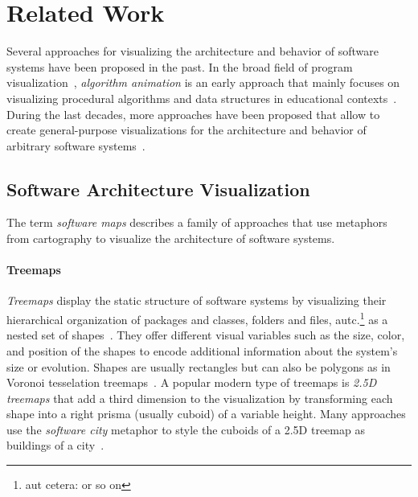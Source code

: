 \section{Related Work}
\label{sec:related_work}

Several approaches for visualizing the architecture and behavior of software systems have been proposed in the past.
In the broad field of program visualization~\cite{myers1986visual,sorva2013review,teyseyre2009overview}, \emph{algorithm animation} is an early approach that mainly focuses on visualizing procedural algorithms and data structures in educational contexts~\cite{brown1984system}.
During the last decades, more approaches have been proposed that allow to create general-purpose visualizations for the architecture and behavior of arbitrary software systems~\cite{reiss2006visualizing,cheng2008xdiva,chis2014moldable,devkota2022domain}.

\subsection{Software Architecture Visualization}

The term \emph{software maps} describes a family of approaches that use metaphors from cartography to visualize the architecture of software systems.

\paragraph{Treemaps}

\emph{Treemaps} display the static structure of software systems by visualizing their hierarchical organization of packages and classes, folders and files, autc.\footnote{aut cetera: or so on} as a nested set of shapes~\cite{limberger2019advanced,limberger2022visual}.
They offer different visual variables such as the size, color, and position of the shapes to encode additional information about the system's size or evolution.
Shapes are usually rectangles but can also be polygons as in Voronoi tesselation treemaps~\cite{balzer2005voronoi}.
A popular modern type of treemaps is \emph{2.5D treemaps} that add a third dimension to the visualization by transforming each shape into a right prisma (usually cuboid) of a variable height.
Many approaches use the \emph{software city} metaphor to style the cuboids of a 2.5D treemap as buildings of a city~\cite{dugerdil2008execution,wettel2007visualizing,ardigo2021visualizing,mortara2021visualization,hoff2022utilizing,limberger2022visual}.


